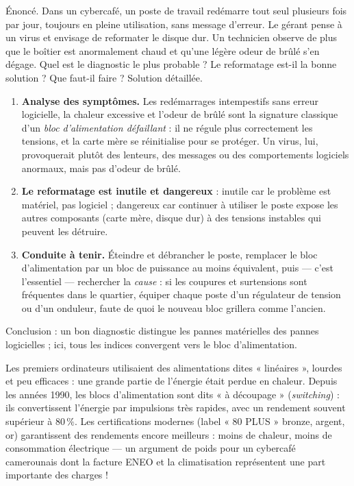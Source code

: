 \documentclass[11pt]{article}
\begin{document}
\begin{exoresolu}
Énoncé. Dans un cybercafé, un poste de travail redémarre tout seul plusieurs fois par jour, toujours en pleine utilisation, sans message d'erreur. Le gérant pense à un virus et envisage de reformater le disque dur. Un technicien observe de plus que le boîtier est anormalement chaud et qu'une légère odeur de brûlé s'en dégage. Quel est le diagnostic le plus probable ? Le reformatage est-il la bonne solution ? Que faut-il faire ?
\tcblower
Solution détaillée.
\begin{enumerate}
\item \textbf{Analyse des symptômes.} Les redémarrages intempestifs sans erreur logicielle, la chaleur excessive et l'odeur de brûlé sont la signature classique d'un \emph{bloc d'alimentation défaillant} : il ne régule plus correctement les tensions, et la carte mère se réinitialise pour se protéger. Un virus, lui, provoquerait plutôt des lenteurs, des messages ou des comportements logiciels anormaux, mais pas d'odeur de brûlé.
\item \textbf{Le reformatage est inutile et dangereux} : inutile car le problème est matériel, pas logiciel ; dangereux car continuer à utiliser le poste expose les autres composants (carte mère, disque dur) à des tensions instables qui peuvent les détruire.
\item \textbf{Conduite à tenir.} Éteindre et débrancher le poste, remplacer le bloc d'alimentation par un bloc de puissance au moins équivalent, puis — c'est l'essentiel — rechercher la \emph{cause} : si les coupures et surtensions sont fréquentes dans le quartier, équiper chaque poste d'un régulateur de tension ou d'un onduleur, faute de quoi le nouveau bloc grillera comme l'ancien.
\end{enumerate}
Conclusion : un bon diagnostic distingue les pannes matérielles des pannes logicielles ; ici, tous les indices convergent vers le bloc d'alimentation.
\end{exoresolu}

\begin{savaistu}
Les premiers ordinateurs utilisaient des alimentations dites « linéaires », lourdes et peu efficaces : une grande partie de l'énergie était perdue en chaleur. Depuis les années 1990, les blocs d'alimentation sont dits « à découpage » (\emph{switching}) : ils convertissent l'énergie par impulsions très rapides, avec un rendement souvent supérieur à $80\,\%$. Les certifications modernes (label « 80 PLUS » bronze, argent, or) garantissent des rendements encore meilleurs : moins de chaleur, moins de consommation électrique — un argument de poids pour un cybercafé camerounais dont la facture ENEO et la climatisation représentent une part importante des charges !
\end{savaistu}
\end{document}
